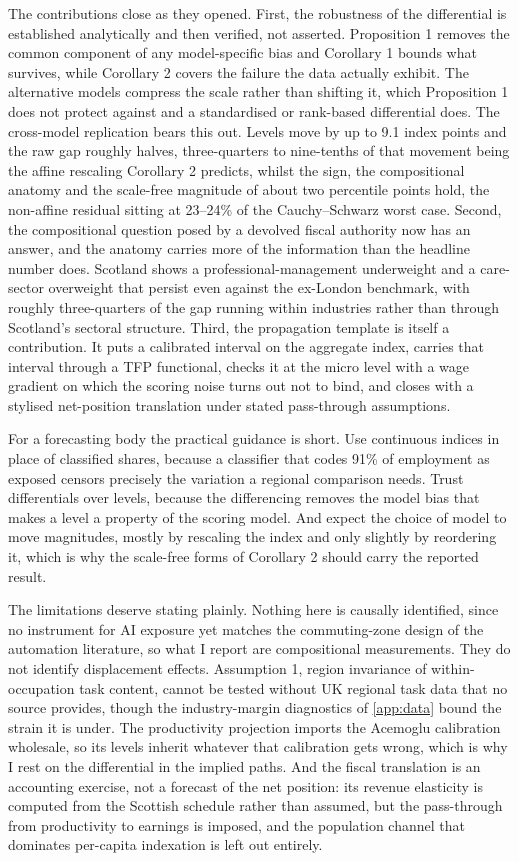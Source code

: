 The contributions close as they opened. First, the robustness of the differential is established analytically and then verified, not asserted. Proposition 1 removes the common component of any model-specific bias and Corollary 1 bounds what survives, while Corollary 2 covers the failure the data actually exhibit. The alternative models compress the scale rather than shifting it, which Proposition 1 does not protect against and a standardised or rank-based differential does. The cross-model replication bears this out. Levels move by up to 9.1 index points and the raw gap roughly halves, three-quarters to nine-tenths of that movement being the affine rescaling Corollary 2 predicts, whilst the sign, the compositional anatomy and the scale-free magnitude of about two percentile points hold, the non-affine residual sitting at 23--24\% of the Cauchy--Schwarz worst case. Second, the compositional question posed by a devolved fiscal authority now has an answer, and the anatomy carries more of the information than the headline number does. Scotland shows a professional-management underweight and a care-sector overweight that persist even against the ex-London benchmark, with roughly three-quarters of the gap running within industries rather than through Scotland's sectoral structure. Third, the propagation template is itself a contribution. It puts a calibrated interval on the aggregate index, carries that interval through a TFP functional, checks it at the micro level with a wage gradient on which the scoring noise turns out not to bind, and closes with a stylised net-position translation under stated pass-through assumptions.

For a forecasting body the practical guidance is short. Use continuous indices in place of classified shares, because a classifier that codes 91\% of employment as exposed censors precisely the variation a regional comparison needs. Trust differentials over levels, because the differencing removes the model bias that makes a level a property of the scoring model. And expect the choice of model to move magnitudes, mostly by rescaling the index and only slightly by reordering it, which is why the scale-free forms of Corollary 2 should carry the reported result.

The limitations deserve stating plainly. Nothing here is causally identified, since no instrument for AI exposure yet matches the commuting-zone design of the automation literature, so what I report are compositional measurements. They do not identify displacement effects. Assumption 1, region invariance of within-occupation task content, cannot be tested without UK regional task data that no source provides, though the industry-margin diagnostics of \cref{app:data} bound the strain it is under. The productivity projection imports the Acemoglu calibration wholesale, so its levels inherit whatever that calibration gets wrong, which is why I rest on the differential in the implied paths. And the fiscal translation is an accounting exercise, not a forecast of the net position: its revenue elasticity is computed from the Scottish schedule rather than assumed, but the pass-through from productivity to earnings is imposed, and the population channel that dominates per-capita indexation is left out entirely.

